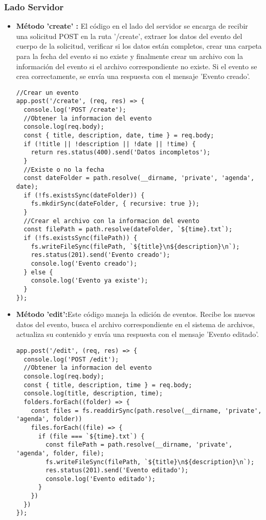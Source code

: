 \documentclass{article}
\begin{document}
\subsubsection{Lado Servidor}
\begin{itemize}
\item{\textbf{Método 'create' :} El código en el lado del servidor se encarga de recibir una solicitud POST en la ruta '/create', extraer los datos del evento del cuerpo de la solicitud, verificar si los datos están completos, crear una carpeta para la fecha del evento si no existe y finalmente crear un archivo con la información del evento si el archivo correspondiente no existe. Si el evento se crea correctamente, se envía una respuesta con el mensaje 'Evento creado'.} 
\begin{lstlisting}[style=ascii-tree]
//Crear un evento
app.post('/create', (req, res) => {
  console.log('POST /create');
  //Obtener la informacion del evento
  console.log(req.body);
  const { title, description, date, time } = req.body;
  if (!title || !description || !date || !time) {
    return res.status(400).send('Datos incompletos');
  }
  //Existe o no la fecha
  const dateFolder = path.resolve(__dirname, 'private', 'agenda', date);
  if (!fs.existsSync(dateFolder)) {
    fs.mkdirSync(dateFolder, { recursive: true });
  }
  //Crear el archivo con la informacion del evento
  const filePath = path.resolve(dateFolder, `${time}.txt`);
  if (!fs.existsSync(filePath)) {
    fs.writeFileSync(filePath, `${title}\n${description}\n`);
    res.status(201).send('Evento creado');
    console.log('Evento creado');
  } else {
    console.log('Evento ya existe');
  }
});
\end{lstlisting}

\item{\textbf{Método 'edit':}Este código maneja la edición de eventos. Recibe los nuevos datos del evento, busca el archivo correspondiente en el sistema de archivos, actualiza su contenido y envía una respuesta con el mensaje 'Evento editado'.} 
\begin{lstlisting}[style=ascii-tree]
app.post('/edit', (req, res) => {
  console.log('POST /edit');
  //Obtener la informacion del evento
  console.log(req.body);
  const { title, description, time } = req.body;
  console.log(title, description, time);
  folders.forEach((folder) => {
    const files = fs.readdirSync(path.resolve(__dirname, 'private', 'agenda', folder))
    files.forEach((file) => {
      if (file === `${time}.txt`) {
        const filePath = path.resolve(__dirname, 'private', 'agenda', folder, file);
        fs.writeFileSync(filePath, `${title}\n${description}\n`);
        res.status(201).send('Evento editado');
        console.log('Evento editado');
      }
    })
  })
});


\end{lstlisting}
\end{itemize}
\end{document}
